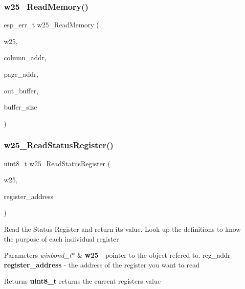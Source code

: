 \mbox{\label{_w25_n01_g_v_8h_a8710f66229a2f0ceb05815251641e272}} 
\subsubsection{w25\+\_\+\+Read\+Memory()}
{\footnotesize\ttfamily esp\+\_\+err\+\_\+t w25\+\_\+\+Read\+Memory (\begin{DoxyParamCaption}\item[{const \textbf{ winbond\+\_\+t} $\ast$}]{w25,  }\item[{uint16\+\_\+t}]{column\+\_\+addr,  }\item[{uint16\+\_\+t}]{page\+\_\+addr,  }\item[{uint8\+\_\+t $\ast$}]{out\+\_\+buffer,  }\item[{size\+\_\+t}]{buffer\+\_\+size }\end{DoxyParamCaption})}

\mbox{\label{_w25_n01_g_v_8h_a9aa01d389cbc8b5ef9c20e05c78e3847}} 
\subsubsection{w25\+\_\+\+Read\+Status\+Register()}
{\footnotesize\ttfamily uint8\+\_\+t w25\+\_\+\+Read\+Status\+Register (\begin{DoxyParamCaption}\item[{const \textbf{ winbond\+\_\+t} $\ast$}]{w25,  }\item[{\textbf{ reg\+\_\+addr}}]{register\+\_\+address }\end{DoxyParamCaption})}

Read the Status Register and return its value. Look up the definitions to know the purpose of each individual register 
\begin{DoxyParams}{Parameters}
{\em winbond\+\_\+t$\ast$} & {\bfseries w25} -\/ pointer to the object refered to.  reg\+\_\+addr {\bfseries register\+\_\+address} -\/ the address of the register you want to read \\
\hline
\end{DoxyParams}
\begin{DoxyReturn}{Returns}
{\bfseries uint8\+\_\+t} returns the current register\textquotesingle{}s value 
\end{DoxyReturn}
\mbox{\label{_w25_n01_g_v_8h_a303da0116217022c0f7ec0d568840a78}} 
